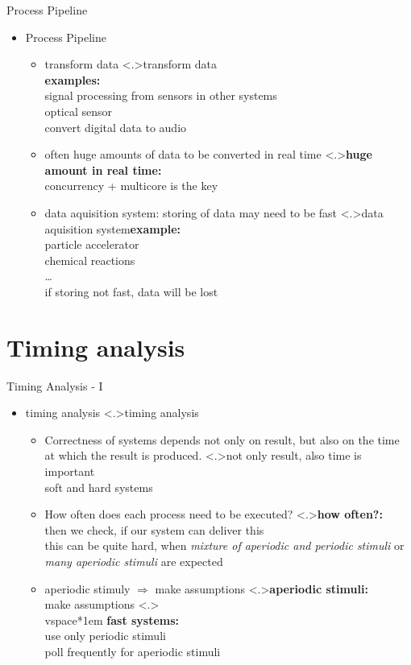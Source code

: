 \documentclass[ngerman={babel}, utf8, bigger, t, xcolor={table,dvipsnames}, ompress, hyperref={bookmarks,colorlinks},red]{beamer}
\begin{document}
\begin{frame}{Process Pipeline}
	\begin{itemize}
		\item Process Pipeline
		\begin{itemize}
			\item transform data
			\note<.>{transform data \\ \textbf{examples:}\\ signal processing from sensors in other systems \\ optical sensor \\ convert digital data to audio}
			\item often huge amounts of data to be converted in real time
			\note<.>{\textbf{huge amount in real time:}\\ concurrency + multicore is the key}
			\item data aquisition system: storing of data may need to be fast
			\note<.>{data aquisition system\textbf{example:}\\ particle accelerator \\ chemical reactions \\ \dots \\ if storing not fast, data will be lost}
		\end{itemize}
	\end{itemize}
\end{frame}

\section{Timing analysis}
\begin{frame}{Timing Analysis - I}
	\begin{itemize}
		\item timing analysis
		\note<.>{timing analysis}
		\begin{itemize}
			\item Correctness of systems depends not only on result, but also on the time at which the result is produced.
			\note<.>{not only result, also time is important \\ soft and hard systems}
			\item How often does each process need to be executed?
			\note<.>{\textbf{how often?:}\\ then we check, if our system can deliver this \\ this can be quite hard, when \emph{mixture of aperiodic and periodic stimuli} or \emph{many aperiodic stimuli} are expected}
			\item aperiodic stimuly $\Rightarrow$ make assumptions
			\note<.>{\textbf{aperiodic stimuli:} \\ make assumptions}
			\note<.>{\\ vspace*{1em} \textbf{fast systems:}\\ use only periodic stimuli \\ poll frequently for aperiodic stimuli}
		\end{itemize}
	\end{itemize}
\end{frame}
\end{document}
